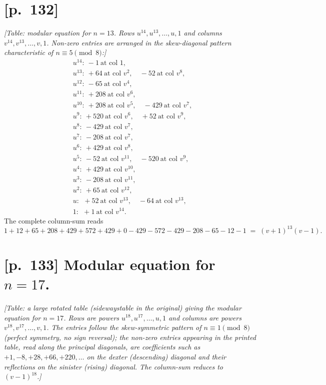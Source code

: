 \documentclass[11pt]{article}
\begin{document}
\section*{[p.~132]}

\textit{[Table: modular equation for $n=13$. Rows $u^{14},u^{13},\ldots,u,1$
and columns $v^{14},v^{13},\ldots,v,1$. Non-zero entries are arranged in
the skew-diagonal pattern characteristic of $n \equiv 5\pmod{8}$:]}
\[
\begin{aligned}
&u^{14}: \ -1 \ \text{at col }1, \\
&u^{13}: \ +64 \ \text{at col }v^2,\quad -52 \ \text{at col }v^8, \\
&u^{12}: \ -65 \ \text{at col }v^4, \\
&u^{11}: \ +208 \ \text{at col }v^6, \\
&u^{10}: \ +208 \ \text{at col }v^5,\quad -429 \ \text{at col }v^7, \\
&u^9: \ +520 \ \text{at col }v^6,\quad +52 \ \text{at col }v^9, \\
&u^8: \ -429 \ \text{at col }v^7, \\
&u^7: \ -208 \ \text{at col }v^7, \\
&u^6: \ +429 \ \text{at col }v^8, \\
&u^5: \ -52 \ \text{at col }v^{11},\quad -520 \ \text{at col }v^9, \\
&u^4: \ +429 \ \text{at col }v^{10}, \\
&u^3: \ -208 \ \text{at col }v^{11}, \\
&u^2: \ +65 \ \text{at col }v^{12}, \\
&u: \ \ +52 \ \text{at col }v^{13},\quad -64 \ \text{at col }v^{13}, \\
&1: \ \ +1 \ \text{at col }v^{14}.
\end{aligned}
\]
The complete column-sum reads
\[
1 + 12 + 65 + 208 + 429 + 572 + 429 + 0 - 429 - 572 - 429 - 208 - 65 - 12 - 1 \;=\; (v+1)^{13}(v - 1).
\]

\clearpage
\section*{[p.~133] Modular equation for $n=17$.}

\textit{[Table: a large rotated table (sidewaystable in the original) giving
the modular equation for $n=17$. Rows are powers $u^{18}, u^{17}, \ldots, u, 1$
and columns are powers $v^{18}, v^{17}, \ldots, v, 1$. The entries follow
the skew-symmetric pattern of $n \equiv 1 \pmod{8}$ (perfect symmetry, no
sign reversal); the non-zero entries appearing in the printed table, read
along the principal diagonals, are coefficients such as $+1, -8, +28, +66,
+220, \ldots$ on the dexter (descending) diagonal and their reflections on
the sinister (rising) diagonal. The column-sum reduces to
$(v - 1)^{18}$.]}
\end{document}
